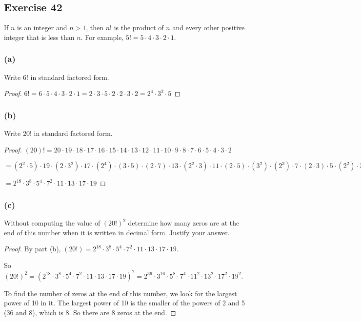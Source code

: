\documentclass[14pt]{extarticle}
\begin{document}
\subsection{Exercise 42}
If $n$ is an integer and $n > 1$, then $n!$ is the product of $n$ and every other positive integer that is less than $n$. For example, $5! = 5\cdot4\cdot3\cdot2\cdot1$.

\subsubsection{(a)}
Write $6!$ in standard factored form.

\begin{proof}
    $6! = 6 \cdot 5 \cdot 4 \cdot 3 \cdot 2 \cdot 1 = 2 \cdot 3 \cdot 5 \cdot 2 \cdot 2 \cdot 3 \cdot 2 = 2^4 \cdot 3^2  \cdot 5$
\end{proof}

\subsubsection{(b)}
Write $20!$ in standard factored form.

\begin{proof}
    $(20)! = 20 \cdot 19 \cdot 18 \cdot 17 \cdot 16 \cdot 15 \cdot 14 \cdot 13 \cdot 12 \cdot 11 \cdot 10 \cdot 9 \cdot 8 \cdot 7 \cdot 6 \cdot 5 \cdot 4 \cdot 3 \cdot 2$

    $= (2^2 \cdot 5) \cdot 19 \cdot (2 \cdot 3^2) \cdot 17 \cdot (2^4) \cdot (3 \cdot 5) \cdot (2 \cdot 7) \cdot 13 \cdot (2^2 \cdot 3) \cdot 11 \cdot (2 \cdot 5) \cdot (3^2) \cdot (2^3) \cdot 7 \cdot (2 \cdot 3) \cdot 5 \cdot (2^2) \cdot 3 \cdot 2$

    $= 2^{18} \cdot 3^{8} \cdot 5^4 \cdot 7^2 \cdot 11 \cdot 13 \cdot 17 \cdot 19$
\end{proof}

\subsubsection{(c)}
Without computing the value of $(20!)^2$ determine how many zeros are at the end of this number when it is written in decimal form. Justify your answer.

\begin{proof}
    By part (b), $(20!) = 2^{18} \cdot 3^{8} \cdot 5^4 \cdot 7^2 \cdot 11 \cdot 13 \cdot 17 \cdot 19$.

    So $(20!)^2 = (2^{18} \cdot 3^{8} \cdot 5^4 \cdot 7^2 \cdot 11 \cdot 13 \cdot 17 \cdot 19)^2 = 2^{36} \cdot 3^{16} \cdot 5^8 \cdot 7^4 \cdot 11^2 \cdot 13^2 \cdot 17^2 \cdot 19^2$.

    To find the number of zeros at the end of this number, we look for the largest power of 10 in it. The largest power of 10 is the smaller of the powers of 2 and 5 (36 and 8), which is 8. So there are 8 zeros at the end.
\end{proof}
\end{document}
